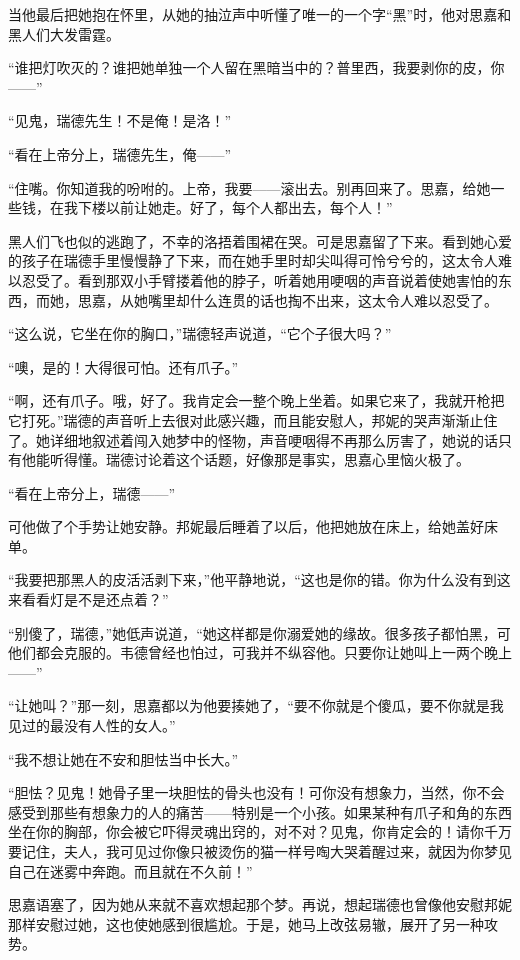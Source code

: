\par 当他最后把她抱在怀里，从她的抽泣声中听懂了唯一的一个字“黑”时，他对思嘉和黑人们大发雷霆。
\par “谁把灯吹灭的？谁把她单独一个人留在黑暗当中的？普里西，我要剥你的皮，你——”
\par “见鬼，瑞德先生！不是俺！是洛！”
\par “看在上帝分上，瑞德先生，俺——”
\par “住嘴。你知道我的吩咐的。上帝，我要——滚出去。别再回来了。思嘉，给她一些钱，在我下楼以前让她走。好了，每个人都出去，每个人！”
\par 黑人们飞也似的逃跑了，不幸的洛捂着围裙在哭。可是思嘉留了下来。看到她心爱的孩子在瑞德手里慢慢静了下来，而在她手里时却尖叫得可怜兮兮的，这太令人难以忍受了。看到那双小手臂搂着他的脖子，听着她用哽咽的声音说着使她害怕的东西，而她，思嘉，从她嘴里却什么连贯的话也掏不出来，这太令人难以忍受了。
\par “这么说，它坐在你的胸口，”瑞德轻声说道，“它个子很大吗？”
\par “噢，是的！大得很可怕。还有爪子。”
\par “啊，还有爪子。哦，好了。我肯定会一整个晚上坐着。如果它来了，我就开枪把它打死。”瑞德的声音听上去很对此感兴趣，而且能安慰人，邦妮的哭声渐渐止住了。她详细地叙述着闯入她梦中的怪物，声音哽咽得不再那么厉害了，她说的话只有他能听得懂。瑞德讨论着这个话题，好像那是事实，思嘉心里恼火极了。
\par “看在上帝分上，瑞德——”
\par 可他做了个手势让她安静。邦妮最后睡着了以后，他把她放在床上，给她盖好床单。
\par “我要把那黑人的皮活活剥下来，”他平静地说，“这也是你的错。你为什么没有到这来看看灯是不是还点着？”
\par “别傻了，瑞德，”她低声说道，“她这样都是你溺爱她的缘故。很多孩子都怕黑，可他们都会克服的。韦德曾经也怕过，可我并不纵容他。只要你让她叫上一两个晚上——”
\par “让她叫？”那一刻，思嘉都以为他要揍她了，“要不你就是个傻瓜，要不你就是我见过的最没有人性的女人。”
\par “我不想让她在不安和胆怯当中长大。”
\par “胆怯？见鬼！她骨子里一块胆怯的骨头也没有！可你没有想象力，当然，你不会感受到那些有想象力的人的痛苦——特别是一个小孩。如果某种有爪子和角的东西坐在你的胸部，你会被它吓得灵魂出窍的，对不对？见鬼，你肯定会的！请你千万要记住，夫人，我可见过你像只被烫伤的猫一样号啕大哭着醒过来，就因为你梦见自己在迷雾中奔跑。而且就在不久前！”
\par 思嘉语塞了，因为她从来就不喜欢想起那个梦。再说，想起瑞德也曾像他安慰邦妮那样安慰过她，这也使她感到很尴尬。于是，她马上改弦易辙，展开了另一种攻势。
